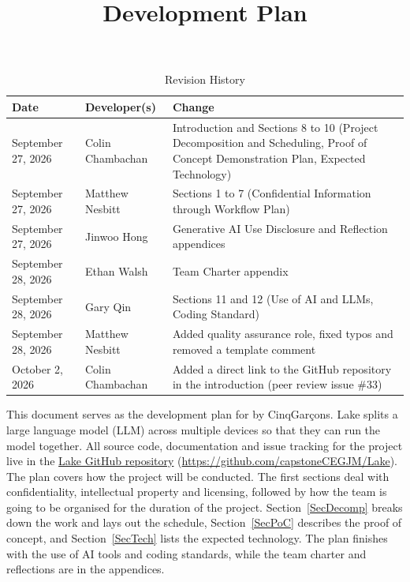 \documentclass{article}
\title{Development Plan\\\progname}
\author{\authname}
\date{}
\begin{document}
\maketitle

\begin{table}[hp]
\caption{Revision History} \label{TblRevisionHistory}
\begin{tabularx}{\textwidth}{llX}
\toprule
\textbf{Date} & \textbf{Developer(s)} & \textbf{Change}\\
\midrule
September 27, 2026 & Colin Chambachan & Introduction and Sections 8 to 10
  (Project Decomposition and Scheduling, Proof of Concept Demonstration Plan,
  Expected Technology)\\
September 27, 2026 & Matthew Nesbitt & Sections 1 to 7 (Confidential
  Information through Workflow Plan)\\
September 27, 2026 & Jinwoo Hong & Generative AI Use Disclosure and
  Reflection appendices\\
September 28, 2026 & Ethan Walsh & Team Charter appendix\\
September 28, 2026 & Gary Qin & Sections 11 and 12 (Use of AI and LLMs,
  Coding Standard)\\
September 28, 2026 & Matthew Nesbitt & Added quality assurance role, fixed
  typos and removed a template comment\\
October 2, 2026 & Colin Chambachan & Added a direct link to the GitHub
  repository in the introduction (peer review issue \#33)\\
\bottomrule
\end{tabularx}
\end{table}

\newpage{}

This document serves as the development plan for \progname{} by CinqGarçons.
Lake splits a large language model (LLM) across multiple devices so that they
can run the model together. All source code, documentation and issue tracking
for the project live in the
\href{https://github.com/capstoneCEGJM/Lake}{Lake GitHub repository}
(\url{https://github.com/capstoneCEGJM/Lake}). The plan covers how the project
will be conducted.
The first sections deal with confidentiality, intellectual property and
licensing, followed by how the team is going to be organised for the duration
of the project. Section~\ref{SecDecomp} breaks down
the work and lays out the schedule, Section~\ref{SecPoC} describes the proof of
concept, and Section~\ref{SecTech} lists the expected technology. The plan
finishes with the use of AI tools and coding standards, while the team
charter and reflections are in the appendices. 
\end{document}
